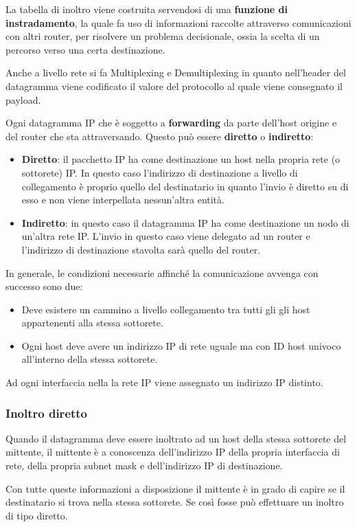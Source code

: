 La tabella di inoltro viene costruita servendosi di una
\textbf{funzione di instradamento}, la quale fa uso di informazioni
raccolte attraverso comunicazioni con altri router, per risolvere un
problema decisionale, ossia la scelta di un percorso verso una certa
destinazione.

Anche a livello rete si fa Multiplexing e Demultiplexing in quanto
nell'header del datagramma viene codificato il valore del protocollo 
al quale viene consegnato il payload.

Ogni datagramma IP che è soggetto a \textbf{forwarding} da parte 
dell'host origine e del router che sta attraversando. Questo può 
essere \textbf{diretto} o \textbf{indiretto}:
\begin{itemize}
	\item \textbf{Diretto}: il pacchetto IP ha come destinazione un
		host nella propria rete (o sottorete) IP. In questo caso 
		l'indirizzo di destinazione a livello di collegamento è proprio
		quello del destinatario in quanto l'invio è diretto su di esso
		e non viene interpellata nessun'altra entità.
	\item \textbf{Indiretto}: in questo caso il datagramma IP ha come 
		destinazione un nodo di un'altra rete IP. L'invio in questo
		caso viene delegato ad un router e l'indirizzo di destinazione
		stavolta sarà quello del router.
\end{itemize}
In generale, le condizioni necessarie affinché la comunicazione 
avvenga con successo sono due:
\begin{itemize}
	\item Deve esistere un cammino a livello collegamento tra tutti gli
		gli host appartenenti alla stessa sottorete.
	\item Ogni host deve avere un indirizzo IP di rete uguale ma con
		ID host univoco all'interno della stessa sottorete.
\end{itemize}
Ad ogni interfaccia nella la rete IP viene assegnato un indirizzo IP 
distinto.

\subsubsection{Inoltro diretto}
Quando il datagramma deve essere inoltrato ad un host della stessa 
sottorete del mittente, il mittente è a conoscenza dell'indirizzo IP
della propria interfaccia di rete, della propria subnet mask e 
dell'indirizzo IP di destinazione.

Con tutte queste informazioni a disposizione il mittente è in grado di
capire se il destinatario si trova nella stessa sottorete. Se così
fosse può effettuare un inoltro di tipo diretto.

